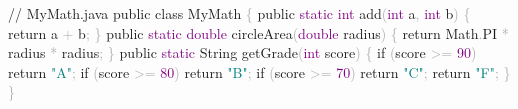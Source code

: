 \documentclass[
  justified,
  openright,
]{tufte-book}
\newcommand{\BuiltInTok}[1]{#1}
\newcommand{\CommentTok}[1]{\textcolor{MidGray}{#1}}
\newcommand{\ControlFlowTok}[1]{\textcolor{BrandBlue}{#1}}
\newcommand{\DataTypeTok}[1]{\textcolor{Purple}{#1}}
\newcommand{\DecValTok}[1]{\textcolor{Purple}{#1}}
\newcommand{\FunctionTok}[1]{\textcolor{BrandBlue}{#1}}
\newcommand{\KeywordTok}[1]{\textcolor{BrandBlue}{#1}}
\newcommand{\NormalTok}[1]{#1}
\newcommand{\OperatorTok}[1]{\textcolor{DarkGray}{#1}}
\newcommand{\StringTok}[1]{\textcolor{Teal}{#1}}
\newenvironment{Shaded}{%
  \begin{snugshade}
}{%
  \end{snugshade}
}
\begin{document}
\begin{Shaded}
\begin{Highlighting}[]
\CommentTok{// MyMath.java}
\KeywordTok{public} \KeywordTok{class}\NormalTok{ MyMath }\OperatorTok{\{}
    \KeywordTok{public} \DataTypeTok{static} \DataTypeTok{int} \FunctionTok{add}\OperatorTok{(}\DataTypeTok{int}\NormalTok{ a}\OperatorTok{,} \DataTypeTok{int}\NormalTok{ b}\OperatorTok{)} \OperatorTok{\{} \ControlFlowTok{return}\NormalTok{ a }\OperatorTok{+}\NormalTok{ b}\OperatorTok{;} \OperatorTok{\}}
    \KeywordTok{public} \DataTypeTok{static} \DataTypeTok{double} \FunctionTok{circleArea}\OperatorTok{(}\DataTypeTok{double}\NormalTok{ radius}\OperatorTok{)} \OperatorTok{\{} \ControlFlowTok{return} \BuiltInTok{Math}\OperatorTok{.}\FunctionTok{PI} \OperatorTok{*}\NormalTok{ radius }\OperatorTok{*}\NormalTok{ radius}\OperatorTok{;} \OperatorTok{\}}
    \KeywordTok{public} \DataTypeTok{static} \BuiltInTok{String} \FunctionTok{getGrade}\OperatorTok{(}\DataTypeTok{int}\NormalTok{ score}\OperatorTok{)} \OperatorTok{\{}
        \ControlFlowTok{if} \OperatorTok{(}\NormalTok{score }\OperatorTok{\textgreater{}=} \DecValTok{90}\OperatorTok{)} \ControlFlowTok{return} \StringTok{"A"}\OperatorTok{;}
        \ControlFlowTok{if} \OperatorTok{(}\NormalTok{score }\OperatorTok{\textgreater{}=} \DecValTok{80}\OperatorTok{)} \ControlFlowTok{return} \StringTok{"B"}\OperatorTok{;}
        \ControlFlowTok{if} \OperatorTok{(}\NormalTok{score }\OperatorTok{\textgreater{}=} \DecValTok{70}\OperatorTok{)} \ControlFlowTok{return} \StringTok{"C"}\OperatorTok{;}
        \ControlFlowTok{return} \StringTok{"F"}\OperatorTok{;}
    \OperatorTok{\}}
\OperatorTok{\}}
\end{Highlighting}
\end{Shaded}
\end{document}
